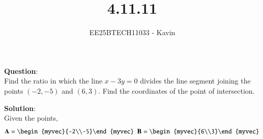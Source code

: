 \documentclass[journal]{IEEEtran}
\begin{document}

\vspace{3cm}

\title{4.11.11}
\author{EE25BTECH11033 - Kavin}
{\let\newpage\relax\maketitle}

\renewcommand{\thefigure}{\theenumi}
\renewcommand{\thetable}{\theenumi}
\setlength{\intextsep}{10pt} %
\textbf{Question}:\\
Find the ratio in which the line $x - 3y = 0$ divides the line segment joining the points $(-2, -5)$ and $(6, 3)$. Find the coordinates of the point of intersection.\\
\bigskip


\textbf{Solution}:\\
Given the points,
\begin{align}
    \vec{A}=\begin{myvec}{-2\\-5}\end{myvec}\ \ 
    \vec{B}=\begin{myvec}{6\\3}\end{myvec}
\end{align}
\bigskip
\end{document}
